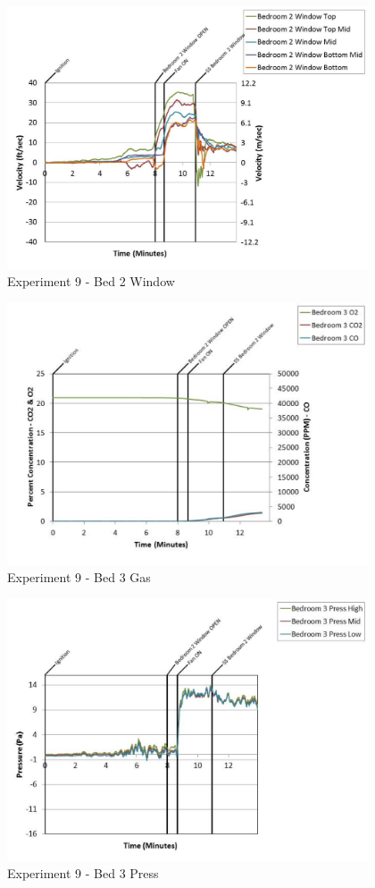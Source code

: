 \documentclass{article}
\begin{document}
\begin{appendices}
	\begin{figure}[h!]
		\centering
		\includegraphics[height=3.05in]{0_Images/Results_Charts/Exp_9_Charts/Bed2Window.pdf}
		\caption{Experiment 9 - Bed 2 Window}
	\end{figure}
 
	\clearpage

	\begin{figure}[h!]
		\centering
		\includegraphics[height=3.05in]{0_Images/Results_Charts/Exp_9_Charts/Bed3Gas.pdf}
		\caption{Experiment 9 - Bed 3 Gas}
	\end{figure}
 

	\begin{figure}[h!]
		\centering
		\includegraphics[height=3.05in]{0_Images/Results_Charts/Exp_9_Charts/Bed3Press.pdf}
		\caption{Experiment 9 - Bed 3 Press}
	\end{figure}
 

\end{appendices}
\end{document}

